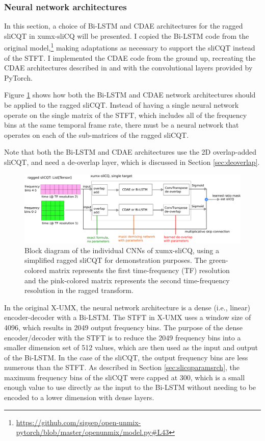 \documentclass[report.tex]{subfiles}
\begin{document}
\subsubsection{Neural network architectures}
\label{sec:slicqarches}

In this section, a choice of Bi-LSTM and CDAE architectures for the ragged sliCQT in xumx-sliCQ will be presented. I copied the Bi-LSTM code from the original model,\footnote{\url{https://github.com/sigsep/open-unmix-pytorch/blob/master/openunmix/model.py\#L43}} making adaptations as necessary to support the sliCQT instead of the STFT. I implemented the CDAE code from the ground up, recreating the CDAE architectures described in \textcite{plumbley1} and \textcite{plumbley2} with the convolutional layers provided by PyTorch.

Figure \ref{fig:cdaeslicqt} shows how both the Bi-LSTM and CDAE network architectures should be applied to the ragged sliCQT. Instead of having a single neural network operate on the single matrix of the STFT, which includes all of the frequency bins at the same temporal frame rate, there must be a neural network that operates on each of the sub-matrices of the ragged sliCQT.

Note that both the Bi-LSTM and CDAE architectures use the 2D overlap-added sliCQT, and need a de-overlap layer, which is discussed in Section \ref{sec:deoverlap}.

\begin{figure}[ht]
	\centering
	\includegraphics[width=\textwidth]{./images-blockdiagrams/xumx_slicq_pertarget_cdae_bilstm.png}
	\caption{Block diagram of the individual CNNs of xumx-sliCQ, using a simplified ragged sliCQT for demonstration purposes. The green-colored matrix represents the first time-frequency (TF) resolution and the pink-colored matrix represents the second time-frequency resolution in the ragged transform.}
	\label{fig:cdaeslicqt}
\end{figure}

In the original X-UMX, the neural network architecture is a dense (i.e., linear) encoder-decoder with a Bi-LSTM. The STFT in X-UMX uses a window size of 4096, which results in 2049 output frequency bins. The purpose of the dense encoder/decoder with the STFT is to reduce the 2049 frequency bins into a smaller dimension set of 512 values, which are then used as the input and output of the Bi-LSTM. In the case of the sliCQT, the output frequency bins are less numerous than the STFT. As described in Section \ref{sec:slicqparamsrch}, the maximum frequency bins of the sliCQT were capped at 300, which is a small enough value to use directly as the input to the Bi-LSTM without needing to be encoded to a lower dimension with dense layers.
\end{document}
